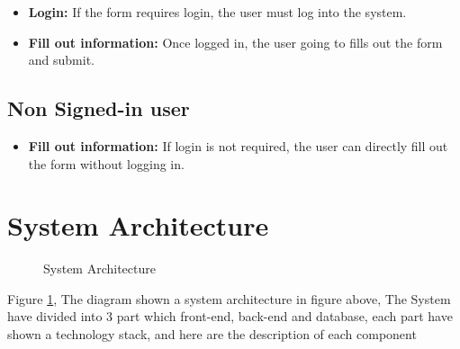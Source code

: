 \documentclass[12pt,oneside,openright,a4paper]{cpe-english-project}
\begin{document}
\begin{itemize}
\item  \textbf{Login:} If the form requires login, the user must log into the system.
\item  \textbf{Fill out information:} Once logged in, the user going to fills out the form and submit.
\end{itemize}


\subsection{Non Signed-in user}

\begin{itemize}
\item  \textbf{Fill out information:} If login is not required, the user can directly fill out the form without logging in.
\end{itemize}


\section{System Architecture}

\begin{figure}[!h]
\centering
{}
\caption{System Architecture}\label{fig:system-arch}
\end{figure}

Figure \ref{fig:system-arch}, The diagram shown a system architecture in figure above, The System have divided into 3 part which front-end, back-end and database, each part have shown a technology stack, and here are the description of each component
\end{document}
